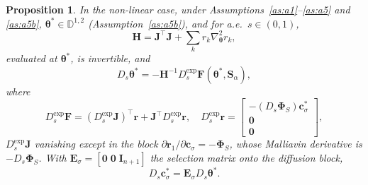 \documentclass[11pt, a4paper]{article}
\theoremstyle{theoremstyle}
\newtheorem{proposition}[theorem]{Proposition}
\theoremstyle{definitionstyle}
\begin{document}
\begin{proposition}\label{prop:Dtheta}
    In the non-linear case, under Assumptions~\ref{as:a1}--\ref{as:a5} and \ref{as:a5b}, $\boldsymbol \theta^* \in \mathbb D^{1,2}$ (Assumption~\ref{as:a5b}), and for a.e.\ $s \in (0,1)$,
    \begin{equation}\label{eq:hessian_def}
        \mathbf H = \mathbf J^\top \mathbf J + \sum_k r_k \nabla^2_{\boldsymbol \theta}r_k,
    \end{equation}
    evaluated at $\boldsymbol\theta^*$, is invertible, and
    \begin{equation}\label{eq:Dtheta}
        D_s \boldsymbol \theta^* = -\mathbf H^{-1} D_s^{\exp} \mathbf F(\boldsymbol \theta^*, \mathbf S_\alpha),
    \end{equation}
    where
    \begin{equation}
        D_s^{\exp}\mathbf F = (D_s^{\exp}\mathbf J)^\top\mathbf r+\mathbf J^\top D_s^{\exp}\mathbf r, \quad D_s^{\exp}\mathbf r = \begin{bmatrix}-(D_s\boldsymbol\Phi_S)\mathbf c_\sigma^*\\\mathbf 0\\\mathbf 0\end{bmatrix},
    \end{equation}
    $D_s^{\exp}\mathbf J$ vanishing except in the block $\partial\mathbf r_1/\partial \mathbf c_\sigma = -\boldsymbol \Phi_S$, whose Malliavin derivative is $-D_s \boldsymbol \Phi_S$. With $\mathbf E_\sigma=[\mathbf 0 \; \mathbf 0 \; \mathbf I_{n+1}]$ the selection matrix onto the diffusion block,
    \begin{equation}
        D_s \mathbf c_\sigma^* = \mathbf E_\sigma D_s \boldsymbol \theta^*.
    \end{equation}
\end{proposition}
\end{document}
